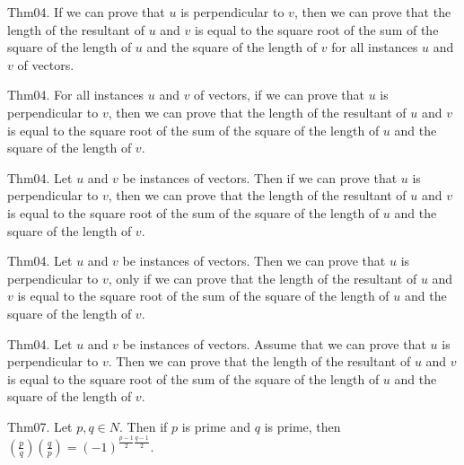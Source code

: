 \documentclass{article}
\begin{document}
Thm04. If we can prove that $u$ is perpendicular to $v$, then we can prove that the length of the resultant of $u$ and $v$ is equal to the square root of the sum of the square of the length of $u$ and the square of the length of $v$ for all instances $u$ and $v$ of vectors.

Thm04. For all instances $u$ and $v$ of vectors, if we can prove that $u$ is perpendicular to $v$, then we can prove that the length of the resultant of $u$ and $v$ is equal to the square root of the sum of the square of the length of $u$ and the square of the length of $v$.

Thm04. Let $u$ and $v$ be instances of vectors. Then if we can prove that $u$ is perpendicular to $v$, then we can prove that the length of the resultant of $u$ and $v$ is equal to the square root of the sum of the square of the length of $u$ and the square of the length of $v$.

Thm04. Let $u$ and $v$ be instances of vectors. Then we can prove that $u$ is perpendicular to $v$, only if we can prove that the length of the resultant of $u$ and $v$ is equal to the square root of the sum of the square of the length of $u$ and the square of the length of $v$.

Thm04. Let $u$ and $v$ be instances of vectors. Assume that we can prove that $u$ is perpendicular to $v$. Then we can prove that the length of the resultant of $u$ and $v$ is equal to the square root of the sum of the square of the length of $u$ and the square of the length of $v$.

Thm07. Let $p , q \in N$. Then if $p$ is prime and $q$ is prime, then $\left(\frac{ p }{ q }\right) \left(\frac{ q }{ p }\right) = (- 1)^ {\frac{ p - 1}{2}\frac{ q - 1}{2}}$.
\end{document}
